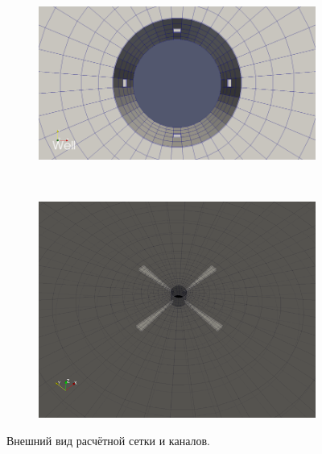 \begin{figure}[H]
	\begin{subfigure}[b]{0.5\textwidth}
	\centering
	\includegraphics[width=1\textwidth]{pic/grid-top.png}
	\label{pic:grid-top}
	\end{subfigure}
~
	\begin{subfigure}[b]{0.5\textwidth}
		\centering
		\includegraphics[width=1\textwidth]{pic/tunnels-top.png}
		\label{pic:tunnels-top}
	\end{subfigure}

	\caption{Внешний вид расчётной сетки и каналов.}
	\label{pic:grid}
\end{figure}

